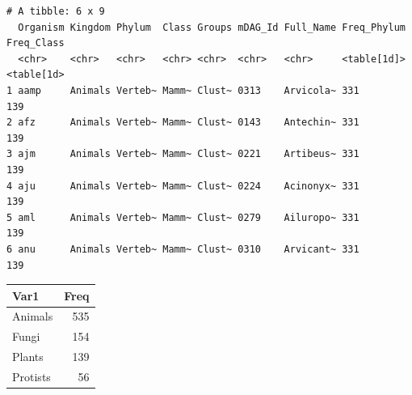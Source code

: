 \documentclass[
  letterpaper,
  DIV=11,
  numbers=noendperiod]{scrreprt}
\newenvironment{Shaded}{}{}
\newcommand{\AttributeTok}[1]{\textcolor[rgb]{0.78,0.47,0.87}{#1}}
\newcommand{\FunctionTok}[1]{\textcolor[rgb]{0.38,0.69,0.94}{#1}}
\newcommand{\NormalTok}[1]{\textcolor[rgb]{0.67,0.70,0.75}{#1}}
\newcommand{\SpecialCharTok}[1]{\textcolor[rgb]{0.34,0.71,0.76}{#1}}
\newcommand{\StringTok}[1]{\textcolor[rgb]{0.60,0.76,0.47}{#1}}
\begin{document}
\begin{verbatim}
# A tibble: 6 x 9
  Organism Kingdom Phylum  Class Groups mDAG_Id Full_Name Freq_Phylum Freq_Class
  <chr>    <chr>   <chr>   <chr> <chr>  <chr>   <chr>     <table[1d]> <table[1d>
1 aamp     Animals Verteb~ Mamm~ Clust~ 0313    Arvicola~ 331         139       
2 afz      Animals Verteb~ Mamm~ Clust~ 0143    Antechin~ 331         139       
3 ajm      Animals Verteb~ Mamm~ Clust~ 0221    Artibeus~ 331         139       
4 aju      Animals Verteb~ Mamm~ Clust~ 0224    Acinonyx~ 331         139       
5 aml      Animals Verteb~ Mamm~ Clust~ 0279    Ailuropo~ 331         139       
6 anu      Animals Verteb~ Mamm~ Clust~ 0310    Arvicant~ 331         139       
\end{verbatim}

\begin{Shaded}
\end{Shaded}

\begin{tabular}{l|r}
\hline
Var1 & Freq\\
\hline
Animals & 535\\
\hline
Fungi & 154\\
\hline
Plants & 139\\
\hline
Protists & 56\\
\hline
\end{tabular}

\begin{Shaded}
\end{Shaded}
\end{document}
